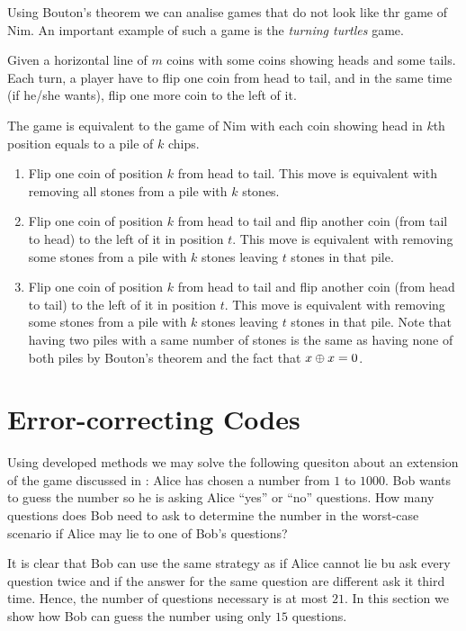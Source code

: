 Using Bouton's theorem we can analise games that do not look like thr game of
Nim. An important example of such a game is the \emph{turning turtles} game.
\begin{game}
  Given a horizontal line of $m$ coins with some coins showing heads and some
  tails. Each turn, a player have to flip one coin from head to tail, and in the
  same time (if he/she wants), flip one more coin to the left of it.
\end{game}
The game is equivalent to the game of Nim with each coin showing head in $k$th
position equals to a pile of $k$ chips.
\begin{enumerate}
  \item Flip one coin of position $k$ from head to tail. This move is equivalent
    with removing all stones from a pile with $k$ stones.
  \item Flip one coin of position $k$ from head to tail and flip another coin
    (from tail to head) to the left of it in position $t$. This move is equivalent
    with removing some stones from a pile with $k$ stones leaving $t$ stones in
    that pile.
  \item Flip one coin of position $k$ from head to tail and flip another coin 
    (from head to tail) to the left of it in position $t$. This move is equivalent
    with removing some stones from a pile with $k$ stones leaving $t$ stones in that
    pile. Note that having two piles with a same number of stones is the same as
    having none of both piles by Bouton's theorem and the fact that 
    $x \oplus x = 0$.
\end{enumerate}

\section{Error-correcting Codes}
Using developed methods we may solve the following quesiton about an extension
of the game discussed in :
Alice has chosen a number from $1$ to $1000$. Bob wants to
guess the number so he is asking Alice ``yes'' or ``no'' questions.
How many questions does Bob need to ask to determine the number in the
worst-case scenario if Alice may lie to one of Bob's questions?

It is clear that Bob can use the same strategy as if Alice cannot lie bu ask
every question twice and if the answer for the same question are different ask
it third time. Hence, the number of questions necessary is at most $21$. In this
section we show how Bob can guess the number using only $15$ questions.

